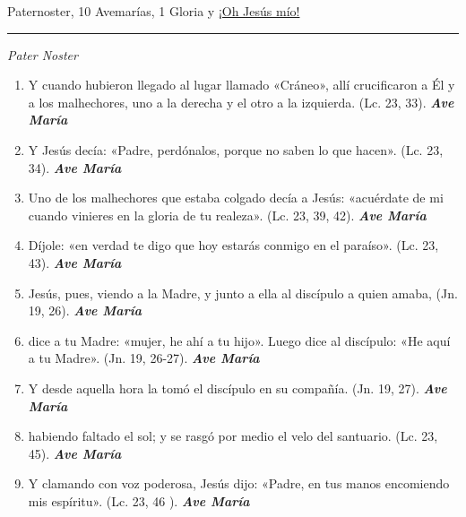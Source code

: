 \documentclass[a4paper,11pt, oneside]{report}
\begin{document}
{{       Paternoster, 10 Avemarías, 1 Gloria y \hyperlink{finalMuerte}{¡Oh Jesús mío!}

      \begin{center}\rule{1\linewidth}{\linethickness}\end{center}

      \medskip
      \textit{Pater Noster}

      \begin{enumerate}
        
        \item Y cuando hubieron llegado al lugar llamado «Cráneo», allí crucificaron a Él y a los malhechores, uno a la derecha y el otro a la izquierda. (Lc. 23, 33). \textbf{\textit{Ave María}}

        \item Y Jesús decía: «Padre, perdónalos, porque no saben lo que hacen». (Lc. 23, 34). \textbf{\textit{Ave María}}

        \item Uno de los malhechores que estaba colgado decía a Jesús: «acuérdate de mi cuando vinieres en la gloria de tu realeza». (Lc. 23, 39, 42). \textbf{\textit{Ave María}}

        \item Díjole: «en verdad te digo que hoy estarás conmigo en el paraíso». (Lc. 23, 43). \textbf{\textit{Ave María}}

        \item Jesús, pues, viendo a la Madre, y junto a ella al discípulo a quien amaba, (Jn. 19, 26). \textbf{\textit{Ave María}}

        \item dice a tu Madre: «mujer, he ahí a tu hijo». Luego dice al discípulo: «He aquí a tu Madre». (Jn. 19, 26-27). \textbf{\textit{Ave María}}

        \item Y desde aquella hora la tomó el discípulo en su compañía. (Jn. 19, 27). \textbf{\textit{Ave María}}

        \item habiendo faltado el sol; y se rasgó por medio el velo del santuario. (Lc. 23, 45). \textbf{\textit{Ave María}}

        \item Y clamando con voz poderosa, Jesús dijo: «Padre, en tus manos encomiendo mis espíritu». (Lc. 23, 46 ). \textbf{\textit{Ave María}}


\end{enumerate}}}
\end{document}
